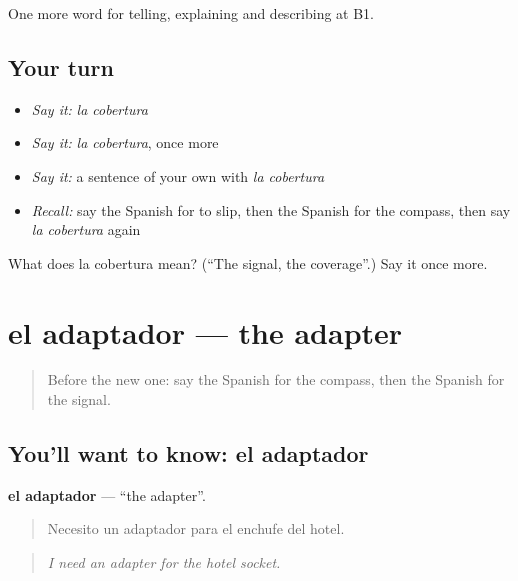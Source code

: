 \begin{grammarlens}[title={What you've built}]
One more word for telling, explaining and describing at B1.
\end{grammarlens}

\subsection*{Your turn}
\begin{itemize}
\raggedright
  \item \emph{Say it:} \emph{la cobertura}
  \item \emph{Say it:} \emph{la cobertura}, once more
  \item \emph{Say it:} a sentence of your own with \emph{la cobertura}
  \item \emph{Recall:} say the Spanish for to slip, then the Spanish for the compass, then say \emph{la cobertura} again
\end{itemize}

\begin{tcolorbox}[breakable,colback=teal!4,colframe=teal!35!black,title={Before you move on}]
What does la cobertura mean? (\textquotedblleft{}The signal, the coverage\textquotedblright{}.) Say it once more.
\end{tcolorbox}
\section[el adaptador]{el adaptador — the adapter}

\label{lesson:ES-C773-adaptador}



\begin{quote}
Before the new one: say the Spanish for the compass, then the Spanish for the signal.
\end{quote}

\subsection*{You'll want to know: el adaptador}
\textbf{el adaptador} — \textquotedblleft{}the adapter\textquotedblright{}.

\begin{quote}
Necesito un adaptador para el enchufe del hotel.
\end{quote}

\begin{quote}
\emph{I need an adapter for the hotel socket.}
\end{quote}

